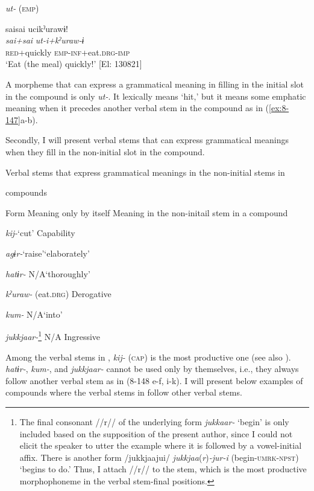 \ex \textit{ut-} (\textsc{emp})

{\TM}
\glll  saisai  ucikˀurawɨ!\\
\textit{sai+sai}  \textit{ut-i+kˀuraw-ɨ}\\
\textsc{red}+quickly  \textsc{emp}-\textsc{inf}+eat.\textsc{drg}-\textsc{imp}\\
\glt ‘Eat (the meal) quickly!’ [El: 130821]

A morpheme that can express a grammatical meaning in filling in the initial slot in the compound is only \textit{ut-}. It lexically means ‘hit,’ but it means some emphatic meaning when it precedes another verbal stem in the compound as in (\ref{ex:8-147}a-b).

  Secondly, I will present verbal stems that can express grammatical meanings when they fill in the non-initial slot in the compound.

\begin{table}
\caption{\label{tab:key:87}Verbal stems that express grammatical meanings in the non-initial stems in} \textmd{compounds}

Form    Meaning only by itself    Meaning in the non-initail stem in a compound

\textit{kij-}\glt ‘cut’    Capability

\textit{agɨr-}\glt ‘raise’\glt ‘elaborately’

\textit{hatɨr-}    N/A\glt ‘thoroughly’

\textit{kˀuraw-}    (eat.\textsc{drg})    Derogative

\textit{kum-}    N/A\glt ‘into’

\textit{jukkjaar-}\footnote{The final consonant //r// of the underlying form \textit{jukkaar-} ‘begin’ is only included based on the supposition of the present author, since I could not elicit the speaker to utter the example where it is followed by a vowel-initial affix. There is another form /jukkjaajui/ \textit{jukkjaa}(\textit{r})\textit{-jur-i} (begin-\textsc{umrk}-\textsc{npst}) ‘begins to do.’ Thus, I attach //r// to the stem, which is the most productive morphophoneme in the verbal stem-final positions.}    N/A    Ingressive
\end{table}

Among the verbal stems in , \textit{kij-} (\textsc{cap}) is the most productive one (see also ). \textit{hatɨr-}, \textit{kum-}, and \textit{jukkjaar-} cannot be used only by themselves, i.e., they always follow another verbal stem as in (8-148 e-f, i-k). I will present below examples of compounds where the verbal stems in  follow other verbal stems.

